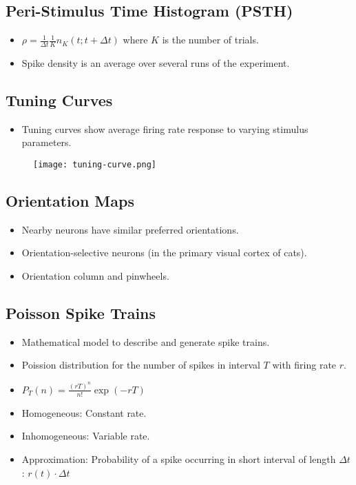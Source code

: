 \documentclass[main]{subfiles}
\begin{document}
\subsection{Peri-Stimulus Time Histogram (PSTH)}
\begin{itemize}[noitemsep,nolistsep]
	\item $\rho = \frac{1}{\Delta t}\frac{1}{K}n_K(t;t+\Delta t)$ where $K$ is the number of trials.
	\item Spike density is an average over several runs of the experiment.
\end{itemize}

\subsection{Tuning Curves}
\begin{itemize}[noitemsep,nolistsep]
	\item Tuning curves show average firing rate response to varying stimulus parameters.
\end{itemize}
\begin{figure}[H]
	\centering
	\texttt{[image: tuning-curve.png]}
\end{figure}

\subsection{Orientation Maps}
\begin{itemize}[noitemsep,nolistsep]
	\item Nearby neurons have similar preferred orientations.
	\item Orientation-selective neurons (in the primary visual cortex of cats).
	\item Orientation column and pinwheels.
\end{itemize}

\subsection{Poisson Spike Trains}
\begin{itemize}[noitemsep,nolistsep]
	\item Mathematical model to describe and generate spike trains.
	\item Poission distribution for the number of spikes in interval $T$ with firing rate $r$.
	\item $P_T(n)=\frac{(rT)^n}{n!}\exp(-rT)$
	\item Homogeneous: Constant rate.
	\item Inhomogeneous: Variable rate.
	\item Approximation: Probability of a spike occurring in short interval of length $\Delta t$: $r(t)\cdot\Delta t$
\end{itemize}
\end{document}
